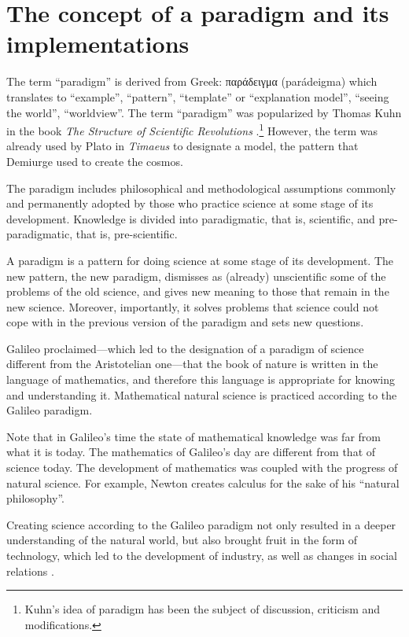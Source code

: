 \documentclass[pdftex,12pt]{article}
\begin{document}
\section{The concept of a paradigm and its implementations} 
The term ``paradigm'' is derived from Greek: \foreignlanguage{greek}{παράδειγμα} (parádeigma) which translates to ``example'', ``pattern'', ``template'' or ``explanation model'', ``seeing the world'', ``worldview''. The term ``paradigm'' was popularized by Thomas Kuhn in the book \emph{The Structure of Scientific Revolutions} \parencite*{Kuhn1962,Kuhn1974}.\footnote{Kuhn's idea of paradigm has been the subject of discussion, criticism and modifications.}
 However, the term was already used by Plato in \emph{Timaeus} to designate a model, the pattern that Demiurge used to create the cosmos.


The paradigm includes philosophical and methodological assumptions commonly and permanently adopted by those who practice science at some stage of its development. Knowledge is divided into paradigmatic, that is, scientific, and pre-paradigmatic, that is, pre-scientific.

A paradigm is a pattern for doing science at some stage of its development. The new pattern, the new paradigm, dismisses as (already) unscientific some of the problems of the old science, and gives new meaning to those that remain in the new science. Moreover, importantly, it solves problems that science could not cope with in the previous version of the paradigm and sets new questions.

Galileo proclaimed---which led to the designation of a paradigm of science different from the Aristotelian one---that the book of nature is written in the language of mathematics, and therefore this language is appropriate for knowing and understanding it. Mathematical natural science is practiced according to the Galileo paradigm.

Note that in Galileo's time the state of mathematical knowledge was far from what it is today. The mathematics of Galileo's day are different from that of science today. The development of mathematics was coupled with the progress of natural science. For example, Newton creates calculus for the sake of his ``natural philosophy''.

Creating science according to the Galileo paradigm not only resulted in a deeper understanding of the natural world, but also brought fruit in the form of technology, which led to the development of industry, as well as changes in social relations \parencite[p.141--148]{MarciszewskiStacewicz2011}.
\end{document}
